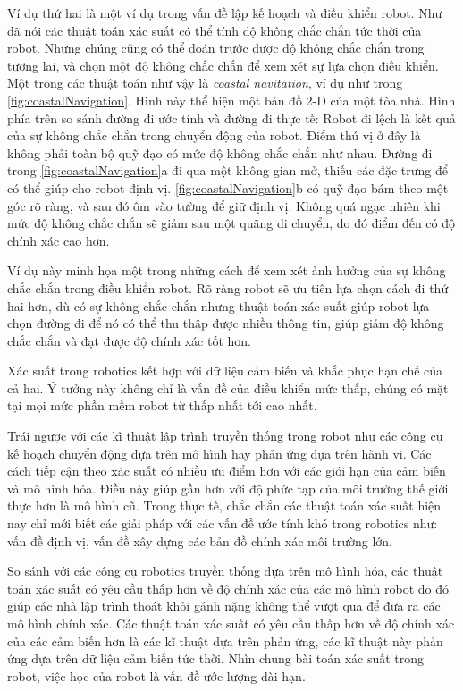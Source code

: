 {Ví dụ thứ hai là một ví dụ trong vấn đề lập kế hoạch và điều khiển robot. Như đã nói các thuật toán xác suất có thể tính độ không chắc chắn tức thời của robot. Nhưng chúng cũng có thể đoán trước được độ không chắc chắn trong tương lai, và chọn một độ không chắc chắn để xem xét sự lựa chọn điều khiển. Một trong các thuật toán như vậy là \textit{coastal navitation}, ví dụ như trong \figurename{ \ref{fig:coastalNavigation}}. Hình này thể hiện một bản đồ 2-D của một tòa nhà. Hình phía trên so sánh đường đi ước tính và đường đi thực tế: Robot đi lệch là kết quả của sự không chắc chắn trong chuyển động của robot. Điểm thú vị ở đây là không phải toàn bộ quỹ đạo có mức độ không chắc chắn như nhau. Đường đi trong \figurename{ \ref{fig:coastalNavigation}}a đi qua một không gian mở, thiếu các đặc trưng để có thể giúp cho robot định vị.  \figurename{ \ref{fig:coastalNavigation}}b có quỹ đạo bám theo một góc rõ ràng, và sau đó ôm vào tường để giữ định vị. Không quá ngạc nhiên khi mức độ không chắc chắn sẽ giảm sau một quãng di chuyển, do đó điểm đến có độ chính xác cao hơn.

Ví dụ này minh họa một trong những cách để xem xét ảnh hưởng của sự không chắc chắn trong điều khiển robot. Rõ ràng robot sẽ ưu tiên lựa chọn cách đi thứ hai hơn, dù có sự không chắc chắn nhưng thuật toán xác suất giúp robot lựa chọn đường đi để nó có thể thu thập được nhiều thông tin, giúp giảm độ không chắc chắn và đạt được độ chính xác tốt hơn.

Xác suất trong robotics kết hợp với dữ liệu cảm biến và khắc phục hạn chế của cả hai. Ý tưởng này không chỉ là vấn đề của điều khiển mức thấp, chúng có mặt tại mọi mức phần mềm robot từ thấp nhất tới cao nhất.

Trái ngược với các kĩ thuật lập trình truyền thống trong robot như các công cụ kế hoạch chuyển động dựa trên mô hình hay phản ứng dựa trên hành vi. Các cách tiếp cận theo xác suất có nhiều ưu điểm hơn với các giới hạn của cảm biến và mô hình hóa. Điều này giúp gần hơn với độ phức tạp của môi trường thế giới thực hơn là mô hình cũ. Trong thực tế, chắc chắn các thuật toán xác suất hiện nay chỉ mới biết các giải pháp với các vấn đề ước tính khó trong robotics như: vấn đề định vị, vấn đề xây dựng các bản đồ chính xác môi trường lớn.

So sánh với các công cụ robotics truyền thống dựa trên mô hình hóa, các thuật toán xác suất có yêu cầu thấp hơn về độ chính xác của các mô hình robot do đó giúp các nhà lập trình thoát khỏi gánh nặng không thể vượt qua để đưa ra các mô hình chính xác. Các thuật toán xác suất có yêu cầu thấp hơn về độ chính xác của các cảm biến hơn là các kĩ thuật dựa trên phản ứng, các kĩ thuật này phản ứng dựa trên dữ liệu cảm biến tức thời. Nhìn chung bài toán xác suất trong robot, việc học của robot là vấn đề ước lượng dài hạn.

}
